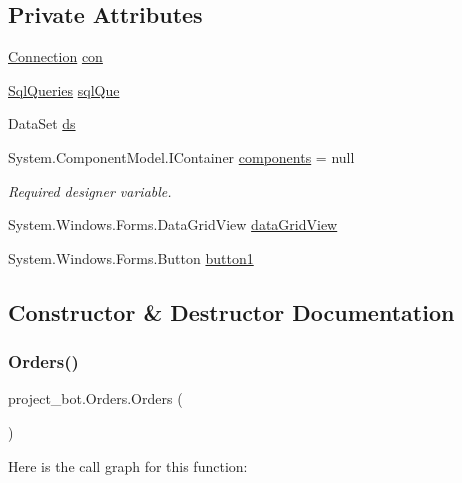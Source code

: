 \subsection*{Private Attributes}
\begin{DoxyCompactItemize}
\item 
\hyperlink{classproject__bot_1_1_connection}{Connection} \hyperlink{classproject__bot_1_1_orders_a7308ca9d5cd84aa87493dafa0c6b5513}{con}
\item 
\hyperlink{classproject__bot_1_1_sql_queries}{Sql\+Queries} \hyperlink{classproject__bot_1_1_orders_ad3037b08c0eb5a23089f774121dfa357}{sql\+Que}
\item 
Data\+Set \hyperlink{classproject__bot_1_1_orders_a67cc9e01d3bf220a72d3dfbf11afa8f2}{ds}
\item 
System.\+Component\+Model.\+I\+Container \hyperlink{classproject__bot_1_1_orders_a2af83a4402f17cb5371e2abf720fc894}{components} = null
\begin{DoxyCompactList}\small\item\em Required designer variable. \end{DoxyCompactList}\item 
System.\+Windows.\+Forms.\+Data\+Grid\+View \hyperlink{classproject__bot_1_1_orders_a99f87634c3a5abc32136dbc0041d496e}{data\+Grid\+View}
\item 
System.\+Windows.\+Forms.\+Button \hyperlink{classproject__bot_1_1_orders_a4be13680a6088a88a856c426e5c20922}{button1}
\end{DoxyCompactItemize}


\subsection{Constructor \& Destructor Documentation}
\mbox{\label{classproject__bot_1_1_orders_aa04aa43a7ce406ffe815e47f16422668}} 
\subsubsection{\texorpdfstring{Orders()}{Orders()}}
{\footnotesize\ttfamily project\+\_\+bot.\+Orders.\+Orders (\begin{DoxyParamCaption}{ }\end{DoxyParamCaption})}

Here is the call graph for this function\+:


